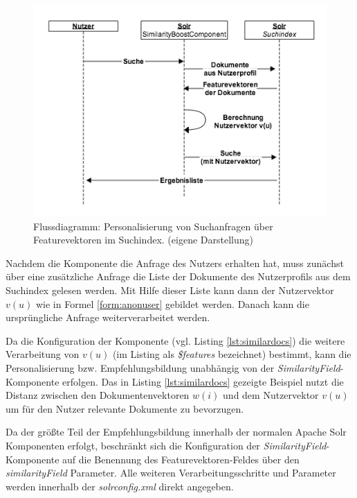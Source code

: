 \begin{figure}[H]
  \centering
  \begin{minipage}[b]{5in}
    \includegraphics[width=\textwidth]{Abbildungen/search-rec2.png}
    \caption[Flussdiagram - interne Empfehlungsbildung]{\footnotesize Flussdiagramm: Personalisierung von Suchanfragen über Featurevektoren im Suchindex. {\scriptsize (eigene Darstellung)}}
    \label{fig:seq-intern-recommender}
\end{minipage}
\end{figure}

Nachdem die Komponente die Anfrage des Nutzers erhalten hat, muss zunächst über eine zusätzliche Anfrage die Liste der Dokumente des Nutzerprofils aus dem Suchindex gelesen werden. Mit Hilfe dieser Liste kann dann der Nutzervektor $v(u)$ wie in Formel \ref{form:anonuser} gebildet werden. Danach kann die ursprüngliche Anfrage weiterverarbeitet werden.

Da die Konfiguration der Komponente (vgl. Listing \ref{lst:similardocs}) die weitere Verarbeitung von $v(u)$ (im Listing als \textit{\$features} bezeichnet) bestimmt, kann die Personalisierung bzw. Empfehlungsbildung unabhängig von der \textit{SimilarityField}-Komponente erfolgen. Das in Listing \ref{lst:similardocs} gezeigte Beispiel nutzt die Distanz zwischen den Dokumentenvektoren $w(i)$ und dem Nutzervektor $v(u)$ um für den Nutzer relevante Dokumente zu bevorzugen.

Da der größte Teil der Empfehlungsbildung innerhalb der normalen Apache Solr Komponenten erfolgt, beschränkt sich die Konfiguration der \textit{SimilarityField}-Komponente auf die Benennung des Featurevektoren-Feldes über den \textit{similarityField} Parameter. Alle weiteren Verarbeitungsschritte und Parameter werden innerhalb der \textit{solrconfig.xml} direkt angegeben.

